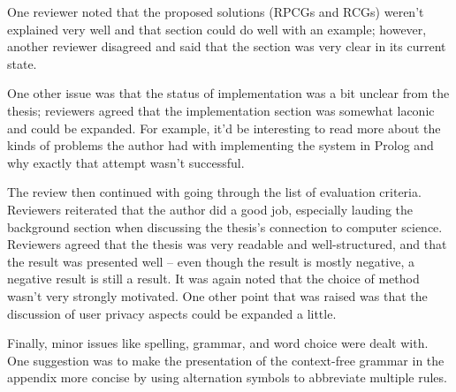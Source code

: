 \documentclass[10pt, oneside]{article}
\begin{document}
One reviewer noted that the proposed solutions (RPCGs and RCGs) weren't
explained very well and that section could do well with an example; however,
another reviewer disagreed and said that the section was very clear in its
current state.

One other issue was that the status of implementation was a bit unclear from the
thesis; reviewers agreed that the implementation section was somewhat laconic
and could be expanded. For example, it'd be interesting to read more about the
kinds of problems the author had with implementing the system in Prolog and why
exactly that attempt wasn't successful.

The review then continued with going through the list of evaluation
criteria. Reviewers reiterated that the author did a good job, especially
lauding the background section when discussing the thesis's connection to
computer science. Reviewers agreed that the thesis was very readable and
well-structured, and that the result was presented well -- even though the
result is mostly negative, a negative result is still a result. It was again
noted that the choice of method wasn't very strongly motivated. One other point
that was raised was that the discussion of user privacy aspects could be
expanded a little.

Finally, minor issues like spelling, grammar, and word choice were dealt
with. One suggestion was to make the presentation of the context-free grammar in
the appendix more concise by using alternation symbols to abbreviate multiple
rules.
\end{document}
